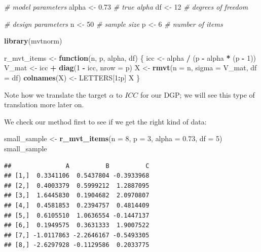 \documentclass[
]{book}
\newenvironment{Shaded}{\begin{snugshade}}{\end{snugshade}}
\newcommand{\AttributeTok}[1]{\textcolor[rgb]{0.13,0.29,0.53}{#1}}
\newcommand{\CommentTok}[1]{\textcolor[rgb]{0.56,0.35,0.01}{\textit{#1}}}
\newcommand{\ControlFlowTok}[1]{\textcolor[rgb]{0.13,0.29,0.53}{\textbf{#1}}}
\newcommand{\DecValTok}[1]{\textcolor[rgb]{0.00,0.00,0.81}{#1}}
\newcommand{\FloatTok}[1]{\textcolor[rgb]{0.00,0.00,0.81}{#1}}
\newcommand{\FunctionTok}[1]{\textcolor[rgb]{0.13,0.29,0.53}{\textbf{#1}}}
\newcommand{\NormalTok}[1]{#1}
\newcommand{\OtherTok}[1]{\textcolor[rgb]{0.56,0.35,0.01}{#1}}
\newcommand{\SpecialCharTok}[1]{\textcolor[rgb]{0.81,0.36,0.00}{\textbf{#1}}}
\begin{document}
\begin{Shaded}
\begin{Highlighting}[]
\CommentTok{\# model parameters}
\NormalTok{alpha }\OtherTok{\textless{}{-}} \FloatTok{0.73} \CommentTok{\# true alpha}
\NormalTok{df }\OtherTok{\textless{}{-}} \DecValTok{12} \CommentTok{\# degrees of freedom}

\CommentTok{\# design parameters}
\NormalTok{n }\OtherTok{\textless{}{-}} \DecValTok{50} \CommentTok{\# sample size}
\NormalTok{p }\OtherTok{\textless{}{-}} \DecValTok{6} \CommentTok{\# number of items}


\FunctionTok{library}\NormalTok{(mvtnorm)}

\NormalTok{r\_mvt\_items }\OtherTok{\textless{}{-}} \ControlFlowTok{function}\NormalTok{(n, p, alpha, df) \{}
\NormalTok{  icc }\OtherTok{\textless{}{-}}\NormalTok{ alpha }\SpecialCharTok{/}\NormalTok{ (p }\SpecialCharTok{{-}}\NormalTok{ alpha }\SpecialCharTok{*}\NormalTok{ (p }\SpecialCharTok{{-}} \DecValTok{1}\NormalTok{))}
\NormalTok{  V\_mat }\OtherTok{\textless{}{-}}\NormalTok{ icc }\SpecialCharTok{+} \FunctionTok{diag}\NormalTok{(}\DecValTok{1} \SpecialCharTok{{-}}\NormalTok{ icc, }\AttributeTok{nrow =}\NormalTok{ p)}
\NormalTok{  X }\OtherTok{\textless{}{-}} \FunctionTok{rmvt}\NormalTok{(}\AttributeTok{n =}\NormalTok{ n, }\AttributeTok{sigma =}\NormalTok{ V\_mat, }\AttributeTok{df =}\NormalTok{ df)}
  \FunctionTok{colnames}\NormalTok{(X) }\OtherTok{\textless{}{-}}\NormalTok{ LETTERS[}\DecValTok{1}\SpecialCharTok{:}\NormalTok{p]}
\NormalTok{  X}
\NormalTok{\}}
\end{Highlighting}
\end{Shaded}

Note how we translate the target \(\alpha\) to \(ICC\) for our DGP; we will see this type of translation more later on.

We check our method first to see if we get the right kind of data:

\begin{Shaded}
\begin{Highlighting}[]
\NormalTok{small\_sample }\OtherTok{\textless{}{-}} \FunctionTok{r\_mvt\_items}\NormalTok{(}\AttributeTok{n =} \DecValTok{8}\NormalTok{, }\AttributeTok{p =} \DecValTok{3}\NormalTok{, }\AttributeTok{alpha =} \FloatTok{0.73}\NormalTok{, }\AttributeTok{df =} \DecValTok{5}\NormalTok{)}
\NormalTok{small\_sample}
\end{Highlighting}
\end{Shaded}

\begin{verbatim}
##               A          B          C
## [1,]  0.3341106  0.5437804 -0.3933968
## [2,]  0.4003379  0.5999212  1.2887095
## [3,]  1.6445830  0.1904682  2.0970807
## [4,]  0.4581853  0.2394757  0.4814409
## [5,]  0.6105510  1.0636554 -0.1447137
## [6,]  0.1949575  0.3631333  1.9007522
## [7,] -1.0117863 -2.2646167 -0.5493305
## [8,] -2.6297928 -0.1129586  0.2033775
\end{verbatim}
\end{document}
